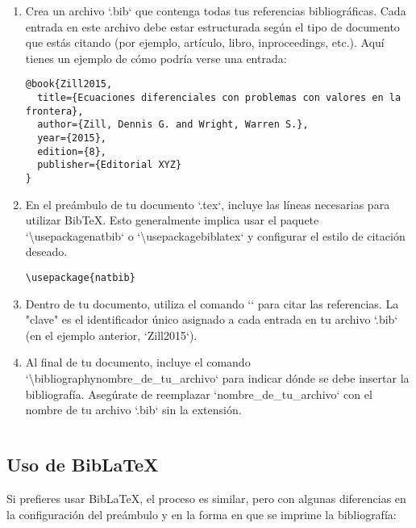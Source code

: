 \documentclass[11pt]{article}
\begin{document}
\begin{enumerate}
    \item Crea un archivo `.bib` que contenga todas tus referencias bibliográficas. Cada entrada en este archivo debe estar estructurada según el tipo de documento que estás citando (por ejemplo, artículo, libro, inproceedings, etc.). Aquí tienes un ejemplo de cómo podría verse una entrada:

\begin{verbatim}
@book{Zill2015,
  title={Ecuaciones diferenciales con problemas con valores en la frontera},
  author={Zill, Dennis G. and Wright, Warren S.},
  year={2015},
  edition={8},
  publisher={Editorial XYZ}
}
\end{verbatim}

    \item En el preámbulo de tu documento `.tex`, incluye las líneas necesarias para utilizar BibTeX. Esto generalmente implica usar el paquete `\textbackslash usepackage{natbib}` o `\textbackslash usepackage{biblatex}` y configurar el estilo de citación deseado.

\begin{verbatim}
\usepackage{natbib}

\end{verbatim}

    \item Dentro de tu documento, utiliza el comando `\cite{clave}` para citar las referencias. La "clave" es el identificador único asignado a cada entrada en tu archivo `.bib` (en el ejemplo anterior, `Zill2015`).

    \item Al final de tu documento, incluye el comando `\textbackslash bibliography{nombre\_de\_tu\_archivo}` para indicar dónde se debe insertar la bibliografía. Asegúrate de reemplazar `nombre\_de\_tu\_archivo` con el nombre de tu archivo `.bib` sin la extensión.

\begin{verbatim}

\end{verbatim}

\end{enumerate}

\subsection{Uso de BibLaTeX}

Si prefieres usar BibLaTeX, el proceso es similar, pero con algunas diferencias en la configuración del preámbulo y en la forma en que se imprime la bibliografía:
\end{document}
